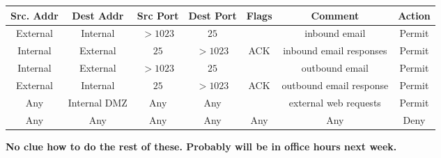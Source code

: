 \documentclass[12pt]{article}
\begin{document}
\begin{enumerate}
  \begin{center}
   \begin{tabular}{||c c c c c c c||}
   \hline
   Src. Addr & Dest Addr  & Src Port &  Dest Port & Flags & Comment & Action \\ [0.5ex]
   \hline\hline
   External & Internal & $>1023$ & $25$ &  & inbound email & Permit \\
   \hline
   Internal & External & $25$ & $>1023$ & ACK & inbound email responses & Permit \\
   \hline
   Internal & External & $>1023$ & $25$ &  & outbound email & Permit \\
   \hline
    External & Internal & $25$ & $>1023$ & ACK & outbound email response & Permit \\
   \hline
    Any & Internal DMZ & Any & Any &  & external web requests & Permit \\
   \hline
   Any & Any & Any & Any & Any & Any & Deny \\
  \hline
  \end{tabular}
  \end{center}

  \textbf{No clue how to do the rest of these. Probably will be in office hours next week.} \\

\end{enumerate}
\end{document}
